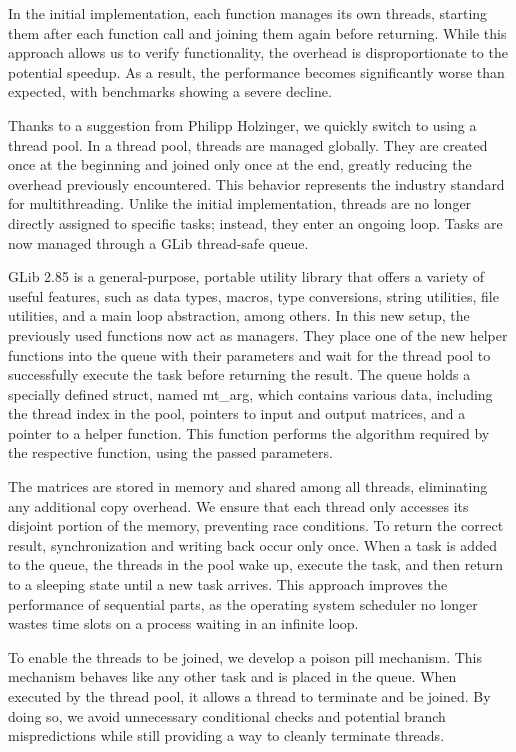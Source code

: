 \documentclass[modern,longauthor]{aastex7}
\let\footnote=\endnote
\begin{document}
In the initial implementation, each function manages its own threads, starting them after each function call and joining them again before returning. While this approach allows us to verify functionality, the overhead is disproportionate to the potential speedup. As a result, the performance becomes significantly worse than expected, with benchmarks showing a severe decline. 

Thanks to a suggestion from Philipp Holzinger, we quickly switch to using a thread pool. In a thread pool, threads are managed globally. They are created once at the beginning and joined only once at the end, greatly reducing the overhead previously encountered. This behavior represents the industry standard for multithreading. Unlike the initial implementation, threads are no longer directly assigned to specific tasks; instead, they enter an ongoing loop. Tasks are now managed through a GLib thread-safe queue.

GLib 2.85 is a general-purpose, portable utility library that offers a variety of useful features, such as data types, macros, type conversions, string utilities, file utilities, and a main loop abstraction, among others.\footnote{GLib – 2.0: \url{https://docs.gtk.org/glib/} (accessed April 14, 2025).} In this new setup, the previously used functions now act as managers. They place one of the new helper functions into the queue with their parameters and wait for the thread pool to successfully execute the task before returning the result. The queue holds a specially defined struct, named mt\_arg, which contains various data, including the thread index in the pool, pointers to input and output matrices, and a pointer to a helper function. This function performs the algorithm required by the respective function, using the passed parameters. 

The matrices are stored in memory and shared among all threads, eliminating any additional copy overhead. We ensure that each thread only accesses its disjoint portion of the memory, preventing race conditions. To return the correct result, synchronization and writing back occur only once. When a task is added to the queue, the threads in the pool wake up, execute the task, and then return to a sleeping state until a new task arrives. This approach improves the performance of sequential parts, as the operating system scheduler no longer wastes time slots on a process waiting in an infinite loop.

To enable the threads to be joined, we develop a poison pill mechanism. This mechanism behaves like any other task and is placed in the queue. When executed by the thread pool, it allows a thread to terminate and be joined. By doing so, we avoid unnecessary conditional checks and potential branch mispredictions while still providing a way to cleanly terminate threads.
\end{document}
